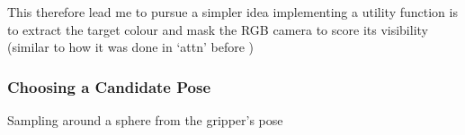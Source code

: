 This therefore lead me to pursue a simpler idea implementing a utility function is to extract the target colour and mask the RGB camera to score its visibility (similar to how it was done in `attn' before )





\subsubsection{Choosing a Candidate Pose}
Sampling around a sphere from the gripper's pose

  